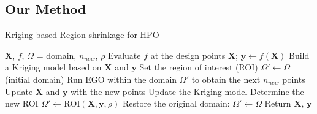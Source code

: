\documentclass{beamer}
\newcommand{\X}{\boldsymbol{X}}
\newcommand{\y}{\boldsymbol{y}}
\begin{document}
\subsection{Our Method}

\begin{frame}{Kriging based Region shrinkage for HPO}
  \begin{algorithm}[H]
      \caption{Sequential Region Shrinkage Method}
      \label{alg:srs}
      \begin{algorithmic}[1]
        \Require $\X$, $f$, $\Omega$ = domain, $n_{new}$, $\rho$
       \State Evaluate $f$ at the design points $\X$; $\y \gets f(\X)$
       \State Build a Kriging model based on $\X$ and $\y$
       \State Set the region of interest (ROI) $\Omega' \gets \Omega$ (initial domain)
         \State Run EGO within the domain $\Omega'$ to obtain the next $n_{new}$ points
         \State Update $\X$ and $\y$ with the new points
         \State Update the Kriging model
         \State Determine the new ROI $\Omega' \gets \text{ROI}(\X, \y, \rho)$
           \State Restore the original domain: $\Omega' \gets \Omega$
         \EndIf
       \EndWhile
       \State Return $\X$, $\y$
     \end{algorithmic}
  \end{algorithm}
 \end{frame}
\end{document}
